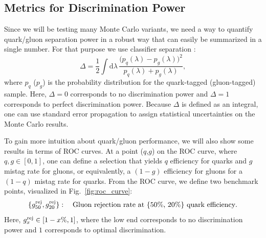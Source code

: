 \documentclass[11pt,letterpaper]{article}
\newcommand{\df}{\text{d}}
\DeclareRobustCommand{\Fig}[1]{Fig.~\ref{#1}}
\newcommand{\be}{\begin{equation}}
\newcommand{\ee}{\end{equation}}
\newcommand{\jdt}[1]{\textbf{\textcolor{darkgreen}{(#1 --jdt)}}}
\begin{document}
\subsection{Metrics for Discrimination Power}

Since we will be testing many Monte Carlo variants, we need a way to quantify quark/gluon separation power in a robust way that can easily be summarized in a single number.  For that purpose we use classifier separation \cite{}:
\be
\Delta =  \frac{1}{2} \int \df \lambda \, \frac{\bigl(p_q(\lambda) - p_g(\lambda)\bigr)^2}{p_q(\lambda) + p_g(\lambda)},
\ee
where $p_q$ ($p_g$) is the probability distribution for the quark-tagged (gluon-tagged) sample.  Here, $\Delta = 0$ corresponds to no discrimination power and $\Delta = 1$ corresponds to perfect discrimination power.  Because $\Delta$ is defined as an integral, one can use standard error propagation to assign statistical uncertainties on the Monte Carlo results.

To gain more intuition about quark/gluon performance, we will also show some results in terms of ROC curves.  At a point ($q$,$g$) on the ROC curve, where $q,g \in [0,1]$, one can define a selection that yields $q$ efficiency for quarks and $g$ mistag rate for gluons, or equivalently, a $(1-g)$ efficiency for gluons for a $(1-q)$ mistag rate for quarks.  From the ROC curve, we define two benchmark points, visualized in \Fig{fig:roc_curve}:
\be
\{ g^{\rm  rej}_{50} ,   g^{\rm  rej}_{20}\} : \quad \text{Gluon rejection rate at \{50\%, 20\%\} quark efficiency}. \\
\ee
Here, $g_x^{\rm rej} \in [1- x\%,1]$, where the low end corresponds to no discrimination power and $1$ corresponds to optimal discrimination.

\end{document}
